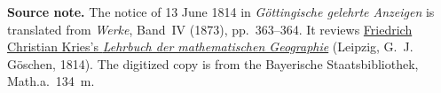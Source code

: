 \par\medskip\begin{small}\noindent\textbf{Source note.} The notice of 13 June 1814 in \textit{Göttingische gelehrte Anzeigen} is translated from \textit{Werke}, Band~IV (1873), pp.~363--364. It reviews \href{https://archive.org/details/10080856bsb}{Friedrich Christian Kries's \textit{Lehrbuch der mathematischen Geographie}} (Leipzig, G.~J. Göschen, 1814). The digitized copy is from the Bayerische Staatsbibliothek, Math.a.~134~m.\par\end{small}
